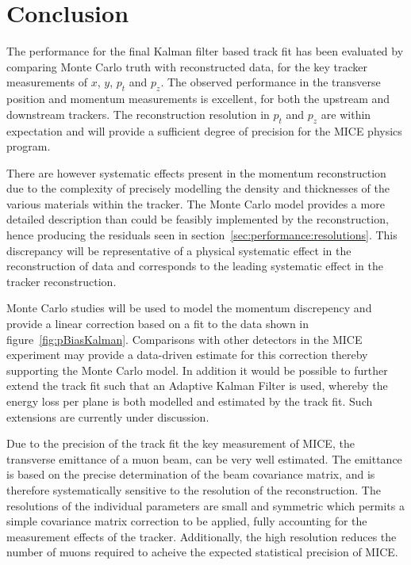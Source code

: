 \section{Conclusion}
\label{sec:Conclusion}

The performance for the final Kalman filter based track fit has been evaluated by comparing Monte Carlo truth with reconstructed data, for the key tracker measurements of $x$, $y$, $p_{t}$ and $p_z$.  The observed performance in the transverse position and momentum measurements is excellent, for both the upstream and downstream trackers. The reconstruction resolution in $p_t$ and $p_z$ are within expectation and will provide a sufficient degree of precision for the MICE physics program.

There are however systematic effects present in the momentum reconstruction due to the complexity of precisely modelling the density and thicknesses of the various materials within the tracker. The Monte Carlo model provides a more detailed description than could be feasibly implemented by the reconstruction, hence producing the residuals seen in section~\ref{sec:performance:resolutions}. This discrepancy will be representative of a physical systematic effect in the reconstruction of data and corresponds to the leading systematic effect in the tracker reconstruction.

Monte Carlo studies will be used to model the momentum discrepency and provide a linear correction based on a fit to the data shown in figure~\ref{fig:pBiasKalman}. Comparisons with other detectors in the MICE experiment may provide a data-driven estimate for this correction thereby supporting the Monte Carlo model. In addition it would be possible to further extend the track fit such that an Adaptive Kalman Filter is used, whereby the energy loss per plane is both modelled and estimated by the track fit. Such extensions are currently under discussion.

Due to the precision of the track fit the key measurement of MICE, the transverse emittance of a muon beam, can be very well estimated. The emittance is based on the precise determination of the beam covariance matrix, and is therefore systematically sensitive to the resolution of the reconstruction. The resolutions of the individual parameters are small and symmetric which permits a simple covariance matrix correction to be applied, fully accounting for the measurement effects of the tracker. Additionally, the high resolution reduces the number of muons required to acheive the expected statistical precision of MICE.

